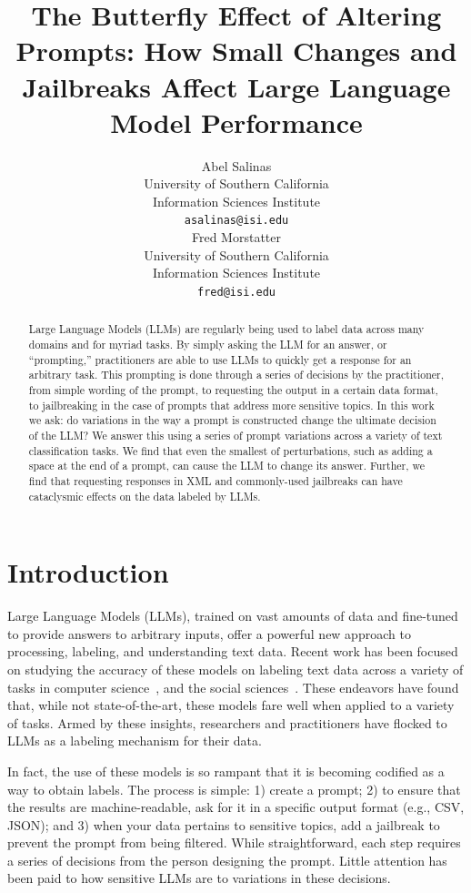 \documentclass[11pt, dvipsnames]{article}
\title{The Butterfly Effect of Altering Prompts: How Small Changes and Jailbreaks Affect Large Language Model Performance}
\author{Abel Salinas \\
  University of Southern California \\
  Information Sciences Institute \\
  \texttt{asalinas@isi.edu} \\\And
  Fred Morstatter \\
  University of Southern California \\
  Information Sciences Institute \\
  \texttt{fred@isi.edu} \\}
\begin{document}
\maketitle
\begin{abstract}
Large Language Models (LLMs) are regularly being used to label data across many domains and for myriad tasks. By simply asking the LLM for an answer, or ``prompting,'' practitioners are able to use LLMs to quickly get a response for an arbitrary task. This prompting is done through a series of decisions by the practitioner, from simple wording of the prompt, to requesting the output in a certain data format, to jailbreaking in the case of prompts that address more sensitive topics. In this work we ask: do variations in the way a prompt is constructed change the ultimate decision of the LLM? We answer this using a series of prompt variations across a variety of text classification tasks. We find that even the smallest of perturbations, such as adding a space at the end of a prompt, can cause the LLM to change its answer. Further, we find that requesting responses in XML and commonly-used jailbreaks can have cataclysmic effects on the data labeled by LLMs. 
\end{abstract}

\section{Introduction}
Large Language Models (LLMs), trained on vast amounts of data and fine-tuned to provide answers to arbitrary inputs, offer a powerful new approach to processing, labeling, and understanding text data. Recent work has been focused on studying the accuracy of these models on labeling text data across a variety of tasks in computer science~\cite{Koco__2023}, and the social sciences~\cite{zhu2023can}. These endeavors have found that, while not state-of-the-art, these models fare well when applied to a variety of tasks. Armed by these insights, researchers and practitioners have flocked to LLMs as a labeling mechanism for their data.

In fact, the use of these models is so rampant that it is becoming codified as a way to obtain labels. The process is simple: 1) create a prompt; 2) to ensure that the results are machine-readable, ask for it in a specific output format (e.g., CSV, JSON); and 3) when your data pertains to sensitive topics, add a jailbreak to prevent the prompt from being filtered. While straightforward, each step requires a series of decisions from the person designing the prompt. Little attention has been paid to how sensitive LLMs are to variations in these decisions.
\end{document}
